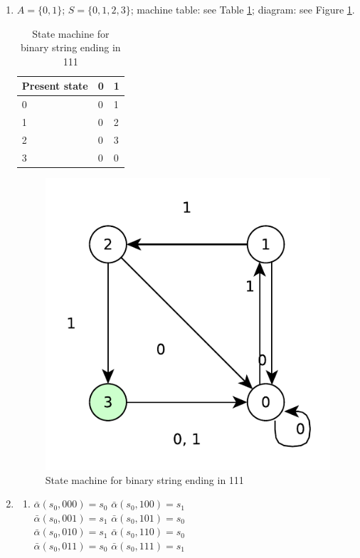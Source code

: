 \documentclass{article}
\begin{document}
\begin{enumerate}
    \item $A = \{0, 1\}$; $S = \{0, 1, 2, 3\}$; machine table: see Table \ref{tab:ends-in-111}; diagram: see Figure \ref{fig:ends-in-111}.
    \begin{table}[]
        \centering
        \begin{tabular}{l|ll}
        Present state & 0 & 1 \\ \hline
        0             & 0 & 1 \\
        1             & 0 & 2 \\
        2             & 0 & 3 \\
        3             & 0 & 0
        \end{tabular}
        \caption{State machine for binary string ending in 111}
        \label{tab:ends-in-111}
    \end{table}
    \begin{figure}[!ht]
        \centering
        \includegraphics[scale=0.5]{diagrams/ends-in-111.pdf}
        \caption{State machine for binary string ending in 111}
        \label{fig:ends-in-111}
    \end{figure}

    \item \begin{enumerate}[label=(\alph*)]
        \item 
        $\bar{\alpha}(s_0, 000) = s_0$\quad
        $\bar{\alpha}(s_0, 100) = s_1$\\
        $\bar{\alpha}(s_0, 001) = s_1$\quad
        $\bar{\alpha}(s_0, 101) = s_0$\\
        $\bar{\alpha}(s_0, 010) = s_1$\quad
        $\bar{\alpha}(s_0, 110) = s_0$\\
        $\bar{\alpha}(s_0, 011) = s_0$\quad
        $\bar{\alpha}(s_0, 111) = s_1$


\end{enumerate}
\end{enumerate}
\end{document}
